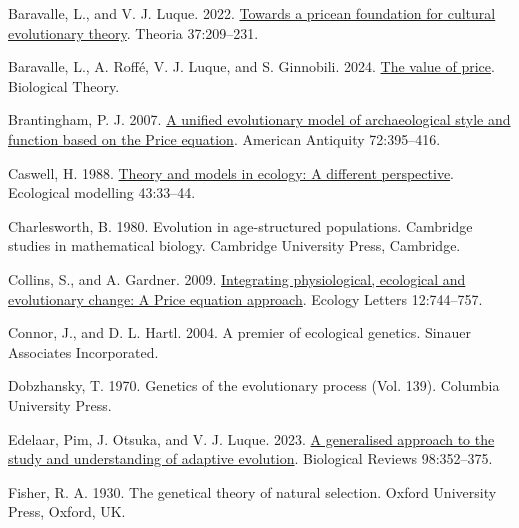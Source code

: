 \documentclass[
]{article}
\newlength{\cslhangindent}
\newlength{\cslentryspacingunit} %
\newenvironment{CSLReferences}[2] %
 {%
  \setlength{\parindent}{0pt}
  \ifodd #1
  \let\oldpar\par
  \def\par{\hangindent=\cslhangindent\oldpar}
  \fi
  \setlength{\parskip}{#2\cslentryspacingunit}
 }%
 {}
\begin{document}
\hypertarget{refs}{}
\begin{CSLReferences}{0}{0}
\leavevmode{}%
Baravalle, L., and V. J. Luque. 2022.
\href{https://doi.org/10.1387/theoria.21940}{Towards a pricean
foundation for cultural evolutionary theory}. Theoria 37:209--231.

\leavevmode{}%
Baravalle, L., A. Roffé, V. J. Luque, and S. Ginnobili. 2024.
\href{https://doi.org/10.1007/s13752-024-00482-4}{The value of price}.
Biological Theory.

\leavevmode{}%
Brantingham, P. J. 2007. \href{https://doi.org/10.2307/40035853}{{A
unified evolutionary model of archaeological style and function based on
the Price equation}}. American Antiquity 72:395--416.

\leavevmode{}%
Caswell, H. 1988.
\href{https://doi.org/10.1016/0304-3800(88)90071-3}{Theory and models in
ecology: A different perspective}. Ecological modelling 43:33--44.

\leavevmode{}%
Charlesworth, B. 1980. Evolution in age-structured populations.
Cambridge studies in mathematical biology. Cambridge University Press,
Cambridge.

\leavevmode{}%
Collins, S., and A. Gardner. 2009.
\href{https://doi.org/10.1111/j.1461-0248.2009.01340.x}{{Integrating
physiological, ecological and evolutionary change: A Price equation
approach}}. Ecology Letters 12:744--757.

\leavevmode{}%
Connor, J., and D. L. Hartl. 2004. {A premier of ecological genetics}.
Sinauer Associates Incorporated.

\leavevmode{}%
Dobzhansky, T. 1970. Genetics of the evolutionary process (Vol. 139).
Columbia University Press.

\leavevmode{}%
Edelaar, Pim, J. Otsuka, and V. J. Luque. 2023.
\href{https://doi.org/10.1111/brv.12910}{{A generalised approach to the
study and understanding of adaptive evolution}}. Biological Reviews
98:352--375.

\leavevmode{}%
Fisher, R. A. 1930. The genetical theory of natural selection. Oxford
University Press, Oxford, UK.


\end{CSLReferences}
\end{document}
